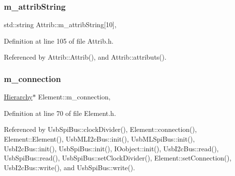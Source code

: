 \mbox{\label{classAttrib_a3414521d7a82476e874b25a5407b5e63}} 
\subsubsection{\texorpdfstring{m\+\_\+attrib\+String}{m\_attribString}}
{\footnotesize\ttfamily std\+::string Attrib\+::m\+\_\+attrib\+String\mbox{[}10\mbox{]}\hspace{0.3cm}{\ttfamily [protected]}, {\ttfamily [inherited]}}



Definition at line 105 of file Attrib.\+h.



Referenced by Attrib\+::\+Attrib(), and Attrib\+::attributs().

\mbox{\label{classElement_abe3de7a5dbbc9a6dd2d7e012e5fdb266}} 
\subsubsection{\texorpdfstring{m\+\_\+connection}{m\_connection}}
{\footnotesize\ttfamily \hyperlink{classHierarchy}{Hierarchy}$\ast$ Element\+::m\+\_\+connection\hspace{0.3cm}{\ttfamily [protected]}, {\ttfamily [inherited]}}



Definition at line 70 of file Element.\+h.



Referenced by Usb\+Spi\+Bus\+::clock\+Divider(), Element\+::connection(), Element\+::\+Element(), Usb\+M\+L\+I2c\+Bus\+::init(), Usb\+M\+L\+Spi\+Bus\+::init(), Usb\+I2c\+Bus\+::init(), Usb\+Spi\+Bus\+::init(), I\+Oobject\+::init(), Usb\+I2c\+Bus\+::read(), Usb\+Spi\+Bus\+::read(), Usb\+Spi\+Bus\+::set\+Clock\+Divider(), Element\+::set\+Connection(), Usb\+I2c\+Bus\+::write(), and Usb\+Spi\+Bus\+::write().

\mbox{\label{classSpecsInterface_a660cb4112ce1c071f277cb6ec115b411}} 
